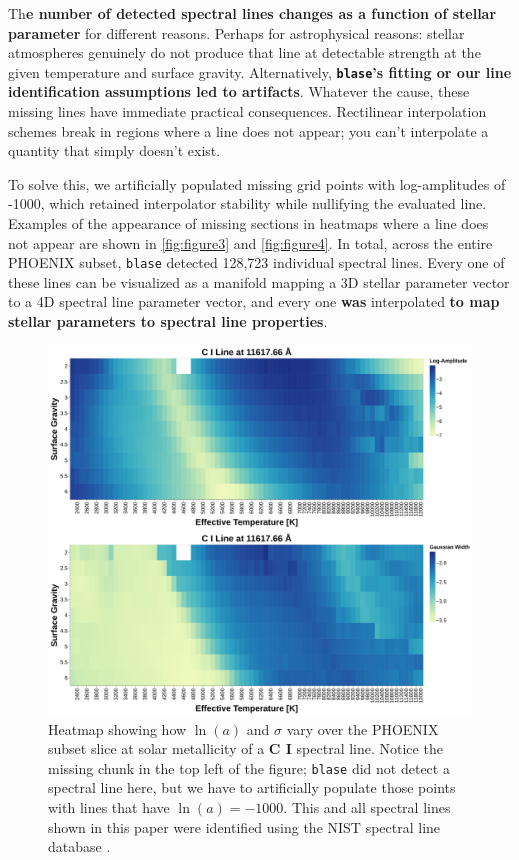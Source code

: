 \documentclass[twocolumn, linenumbers]{aastex631}
\begin{document}
Th\textbf{e number of detected spectral lines changes as a function of stellar parameter} for different reasons.
Perhaps for astrophysical reasons: stellar atmospheres genuinely do not produce that line at detectable strength at the given temperature and surface gravity.
Alternatively, \textbf{\texttt{blase}'s fitting or our line identification assumptions led to artifacts}.
Whatever the cause, these missing lines have immediate practical consequences.
Rectilinear interpolation schemes break in regions where a line does not appear; you can't interpolate a quantity that simply doesn't exist.

To solve this, we artificially populated missing grid points with log-amplitudes of -1000, which retained interpolator stability while nullifying the evaluated line.
Examples of the appearance of missing sections in heatmaps where a line does not appear are shown in \autoref{fig:figure3} and \autoref{fig:figure4}.
In total, across the entire PHOENIX subset, \texttt{blase} detected 128,723 individual spectral lines.
Every one of these lines can be visualized as a manifold mapping a 3D stellar parameter vector to a 4D spectral line parameter vector, and every one \textbf{was} interpolated \textbf{to map stellar parameters to spectral line properties}.
\begin{figure}
    \centering
    \includegraphics[width=\textwidth]{figure3}
    \caption{Heatmap showing how $\ln(a)$ and $\sigma$ vary over the PHOENIX subset slice at solar metallicity of a \textbf{C I} spectral line.
    Notice the missing chunk in the top left of the figure; \texttt{blase} did not detect a spectral line here, but we have to artificially populate those points with lines that have $\ln(a) = -1000$.
    This and all spectral lines shown in this paper were identified using the NIST spectral line database \citep{NIST}.}
    \label{fig:figure3}
\end{figure}
\end{document}
